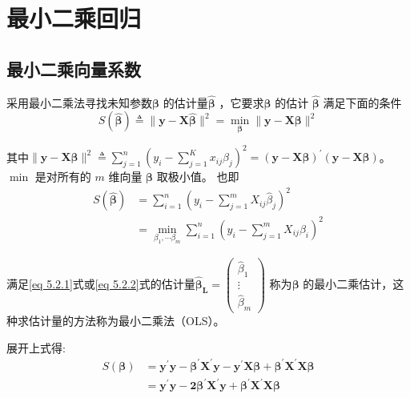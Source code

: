 \section{最小二乘回归}
\subsection{最小二乘向量系数}
采用最小二乘法寻找未知参数$ \boldsymbol{\beta} $ 的估计量$ \boldsymbol{\hat{\beta}} $  ，它要求$ \boldsymbol{\beta} $  的估计 $ \boldsymbol{\hat{\beta}} $  
满足下面的条件
\begin{equation}
    S(\boldsymbol{\hat{\beta}}) \triangleq\|\boldsymbol{y-X \hat{\beta}}\|^{2}=\min_{\boldsymbol{\beta}}\|\boldsymbol{y-X \beta}\|^{2}
    \label{eq 5.2.1}
\end{equation}

其中$ \|\boldsymbol{y-X \beta}\|^{2} \triangleq \sum_{j=1}^{n}\left(y_{i}-\sum_{j=1}^{K} x_{i j} \beta_{j}\right)^{2}
        = \boldsymbol{ (y-X \beta)^{\prime}(y-X \beta)} $。
$ \min $ 是对所有的 $ m $ 维向量 $ \boldsymbol{\beta} $  取极小值。
也即
\begin{equation}
    \begin{aligned}
        S(\boldsymbol{\hat{\beta}}) &=\sum_{i=1}^{n}\left(y_{i}-\sum_{j=1}^{m} X_{i j} \hat{\beta}_{j}\right)^{2} \\
        &=\min _{\beta_{1}, \cdots \beta_{m}} \sum_{i=1}^{n}\left(y_{i}-\sum_{j=1}^{m} X_{i j} \beta_{i}\right)^{2}
    \end{aligned}
    \label{eq 5.2.2}
\end{equation}

满足\ref{eq 5.2.1}式或\ref{eq 5.2.2}式的估计量$ \boldsymbol{ \hat{\beta}_{L} }=\left(\begin{array}{c}
    \hat{\beta}_{1} \\
    \vdots \\
    \hat{\beta}_{m}
    \end{array}\right) $ 称为$ \boldsymbol{\beta} $  的最小二乘估计，这种求估计量的方法称为{\heiti 最小二乘法（OLS）}。

展开上式得:
$$ \begin{aligned} 
    S(\boldsymbol{\beta}) & = \boldsymbol{ y^{\prime} y-\beta^{\prime} X^{\prime} y-y^{\prime} X \beta+\beta^{\prime} X^{\prime} X \beta }  \\ 
                          & = \boldsymbol{ y^{\prime} y-2 \beta^{\prime} X^{\prime} y+\beta^{\prime} X^{\prime} X \beta }
   \end{aligned} $$

